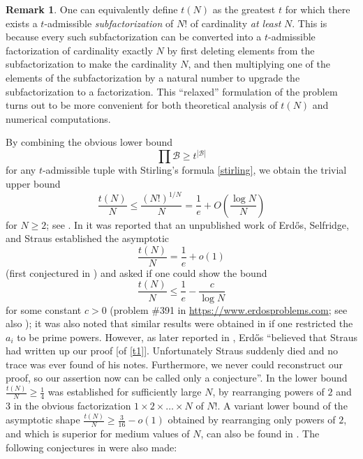 \documentclass[12pt,a4paper,reqno]{amsart}
\numberwithin{equation}{section}
\theoremstyle{plain}
\theoremstyle{definition}
\newtheorem{remark}[theorem]{Remark}
\newcommand\tuple{{\mathcal B}}
\begin{document}
\begin{remark}\label{subfac}  One can equivalently define $t(N)$ as the greatest $t$ for which there exists a $t$-admissible \emph{subfactorization} of $N!$ of cardinality \emph{at least} $N$.  This is because every such subfactorization can be converted into a $t$-admissible factorization of cardinality exactly $N$ by first deleting elements from the subfactorization to make the cardinality $N$, and then multiplying one of the elements of the subfactorization by a natural number to upgrade the subfactorization to a factorization.  This ``relaxed'' formulation of the problem turns out to be more convenient for both theoretical analysis of $t(N)$ and numerical computations.
\end{remark}

By combining the obvious lower bound
\begin{equation}\label{obvious}
 \prod \tuple \geq t^{|\tuple|}
\end{equation}
for any $t$-admissible tuple with Stirling's formula \eqref{stirling}, we obtain the trivial upper bound
\begin{equation}\label{trivial} \frac{t(N)}{N} \leq \frac{(N!)^{1/N}}{N} = \frac{1}{e} + O\left( \frac{\log N}{N}\right)
\end{equation}
for $N \geq 2$; see .  In \cite[p.75]{erdos-graham} it was reported that an unpublished work of Erd\H{o}s, Selfridge, and Straus established the asymptotic
\begin{equation}\label{t1}
  \frac{t(N)}{N} = \frac{1}{e} + o(1)
\end{equation}
(first conjectured in \cite{erdos-71}) and asked if one could show the bound
\begin{equation}\label{Tbound}
   \frac{t(N)}{N} \leq \frac{1}{e} - \frac{c}{\log N}
\end{equation}
for some constant $c>0$ (problem {\#}391 in \url{https://www.erdosproblems.com}; see also \cite[Section B22, p. 122--123]{guy}); it was also noted that similar results were obtained in \cite{algr77} if one restricted the $a_i$ to be prime powers.  However, as later reported in \cite{erdos-96}, Erd\H{o}s ``believed that Straus had written up our proof [of \eqref{t1}]. Unfortunately Straus suddenly died and no trace was ever found of his notes. Furthermore, we never could reconstruct our proof, so our assertion now can be called only a conjecture''.   In \cite{guy} the lower bound $\frac{t(N)}{N} \geq \frac{1}{4}$ was established for sufficiently large $N$, by rearranging powers of $2$ and $3$ in the obvious factorization $1 \times 2 \times \dots \times N$ of $N!$.  A variant lower bound of the asymptotic shape $\frac{t(N)}{N} \geq \frac{3}{16}-o(1)$ obtained by rearranging only powers of $2$, and which is superior for medium values of $N$, can also be found in \cite{guy}.  The following conjectures in \cite{guy} were also made:
\end{document}
